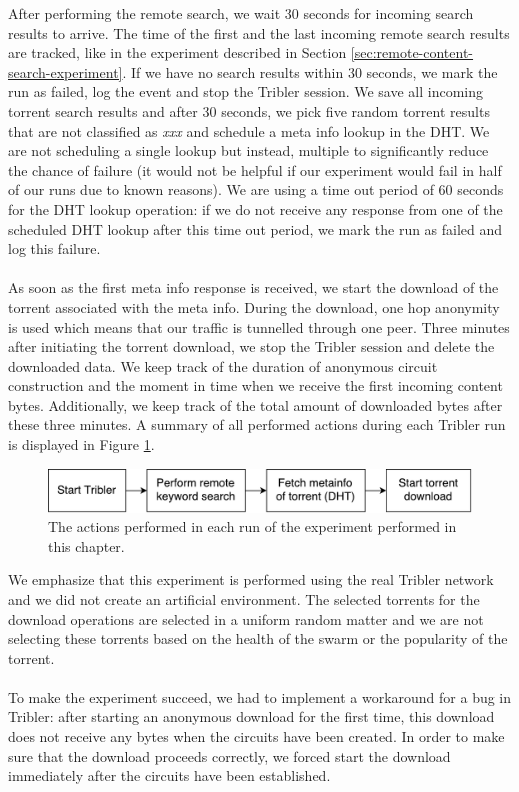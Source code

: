 After performing the remote search, we wait 30 seconds for incoming search results to arrive. The time of the first and the last incoming remote search results are tracked, like in the experiment described in Section \ref{sec:remote-content-search-experiment}. If we have no search results within 30 seconds, we mark the run as failed, log the event and stop the Tribler session. We save all incoming torrent search results and after 30 seconds, we pick five random torrent results that are not classified as \emph{xxx} and schedule a meta info lookup in the DHT. We are not scheduling a single lookup but instead, multiple to significantly reduce the chance of failure (it would not be helpful if our experiment would fail in half of our runs due to known reasons). We are using a time out period of 60 seconds for the DHT lookup operation: if we do not receive any response from one of the scheduled DHT lookup after this time out period, we mark the run as failed and log this failure.\\\\
As soon as the first meta info response is received, we start the download of the torrent associated with the meta info. During the download, one hop anonymity is used which means that our traffic is tunnelled through one peer. Three minutes after initiating the torrent download, we stop the Tribler session and delete the downloaded data. We keep track of the duration of anonymous circuit construction and the moment in time when we receive the first incoming content bytes. Additionally, we keep track of the total amount of downloaded bytes after these three minutes. A summary of all performed actions during each Tribler run is displayed in Figure \ref{fig:big-experiment-setup}.\\

\begin{figure}[!h]
	\centering
	\includegraphics[width=0.7\columnwidth]{images/big_experiment/big_experiment_setup}
	\caption{The actions performed in each run of the experiment performed in this chapter.}
	\label{fig:big-experiment-setup}
\end{figure}

We emphasize that this experiment is performed using the real Tribler network and we did not create an artificial environment. The selected torrents for the  download operations are selected in a uniform random matter and we are not selecting these torrents based on the health of the swarm or the popularity of the torrent.\\\\
To make the experiment succeed, we had to implement a workaround for a bug in Tribler: after starting an anonymous download for the first time, this download does not receive any bytes when the circuits have been created. In order to make sure that the download proceeds correctly, we forced start the download immediately after the circuits have been established.

